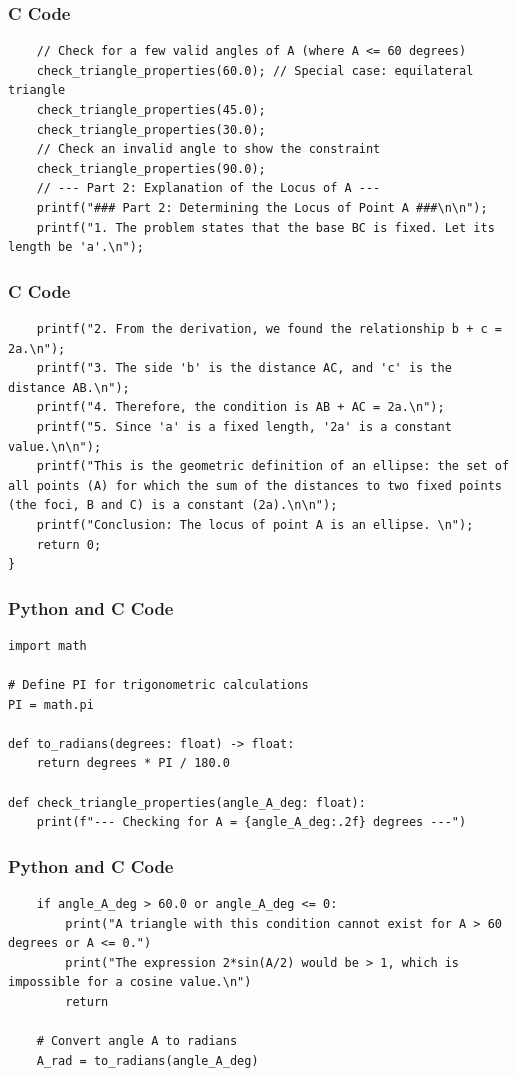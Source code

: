 \documentclass{beamer}
\begin{document}
\begin{frame}[fragile]
\frametitle{C Code}
\begin{lstlisting}
    // Check for a few valid angles of A (where A <= 60 degrees)
    check_triangle_properties(60.0); // Special case: equilateral triangle
    check_triangle_properties(45.0);
    check_triangle_properties(30.0);
    // Check an invalid angle to show the constraint
    check_triangle_properties(90.0);
    // --- Part 2: Explanation of the Locus of A ---
    printf("### Part 2: Determining the Locus of Point A ###\n\n");
    printf("1. The problem states that the base BC is fixed. Let its length be 'a'.\n");
\end{lstlisting}
\end{frame}

\begin{frame}[fragile]
\frametitle{C Code}
\begin{lstlisting}
    printf("2. From the derivation, we found the relationship b + c = 2a.\n");
    printf("3. The side 'b' is the distance AC, and 'c' is the distance AB.\n");
    printf("4. Therefore, the condition is AB + AC = 2a.\n");
    printf("5. Since 'a' is a fixed length, '2a' is a constant value.\n\n");
    printf("This is the geometric definition of an ellipse: the set of all points (A) for which the sum of the distances to two fixed points (the foci, B and C) is a constant (2a).\n\n");
    printf("Conclusion: The locus of point A is an ellipse. \n");
    return 0;
}
\end{lstlisting}
\end{frame}

\begin{frame}[fragile]
\frametitle{Python and C Code}
\begin{lstlisting}
import math

# Define PI for trigonometric calculations
PI = math.pi

def to_radians(degrees: float) -> float:
    return degrees * PI / 180.0

def check_triangle_properties(angle_A_deg: float):
    print(f"--- Checking for A = {angle_A_deg:.2f} degrees ---")
\end{lstlisting}
\end{frame}

\begin{frame}[fragile]
\frametitle{Python and C Code}
\begin{lstlisting}
    if angle_A_deg > 60.0 or angle_A_deg <= 0:
        print("A triangle with this condition cannot exist for A > 60 degrees or A <= 0.")
        print("The expression 2*sin(A/2) would be > 1, which is impossible for a cosine value.\n")
        return

    # Convert angle A to radians
    A_rad = to_radians(angle_A_deg)
\end{lstlisting}
\end{frame}
\end{document}
